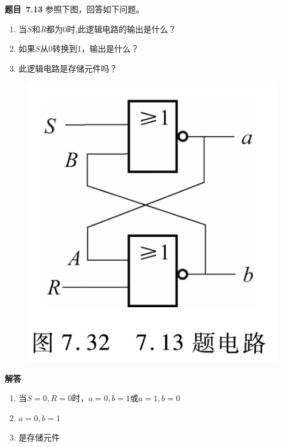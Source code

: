 \documentclass[10pt,a4paper,UTF8]{ctexart}
\newcommand{\problemname}{待定义}
\newenvironment{problem}{\begin{shaded}\par\noindent\textbf{题目\  \problemname}}{\end{shaded}\par}
\newenvironment{solution}{\par\noindent\textbf{解答}\ }{\par}
\begin{document}
\renewcommand{\problemname}{7.13}
\begin{problem}
	参照下图，回答如下问题。
	\begin{enumerate}[(1)]
		\item 当$S$和$R$都为0时,此逻辑电路的输出是什么？
		\item 如果$S$从0转换到1，输出是什么？
		\item 此逻辑电路是存储元件吗？
	\end{enumerate}
\end{problem}

\begin{figure}[H]
	\centering
	\includegraphics[scale=0.18]{img/7.13.png}
\end{figure}

\begin{solution}
	\begin{enumerate}[(1)]
		\item 当$S=0,R=0$时，$a=0,b=1$或$a=1,b=0$
		\item $a=0,b=1$
		\item 是存储元件
	\end{enumerate}
	

\end{solution}
\end{document}
